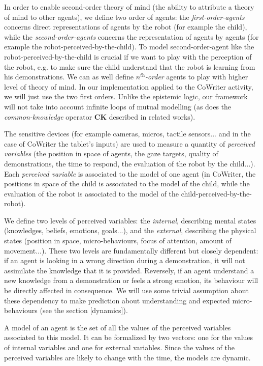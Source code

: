 \documentclass[10pt,a4paper,twocolumn]{article}
\begin{document}
In order to enable second-order theory of mind (the ability to attribute a theory of mind to other agents), we define two order of agents: the \textit{first-order-agents} concerns direct representations of agents by the robot (for example the child), while the \textit{second-order-agents} concerns the representation of agents by agents (for example the robot-perceived-by-the-child). To model second-order-agent like the robot-perceived-by-the-child is crucial if we want to play with the perception of the robot, e.g. to make sure the child understand that the robot is learning from his demonstrations. We can as well define \textit{$n^{\textit{th}}$-order} agents to play with higher level of theory of mind. In our implementation applied to the CoWriter activity, we will just use the two first orders. Unlike the epistemic logic, our framework will not take into account infinite loops of mutual modelling (as does the \textit{common-knowledge} operator \textbf{CK} described in related works). 

The sensitive devices (for example cameras, micros, tactile sensors... and in the case of CoWriter the tablet's inputs) are used to measure a quantity of \textit{perceived variables} (the position in space of agents, the gaze targets, quality of demonstrations, the time to respond, the evaluation of the robot by the child...). Each \textit{perceived variable} is associated to the model of one agent (in CoWriter, the positions in space of the child is associated to the model of the child, while the evaluation of the robot is associated to the model of the child-perceived-by-the-robot). 

We define two levels of perceived variables: the \textit{internal}, describing mental states (knowledges, beliefs, emotions, goals...), and the \textit{external}, describing the physical states (position in space, micro-behaviours, focus of attention, amount of movement...). These two levels are fundamentally different but closely dependent: if an agent is looking in a wrong direction during a demonstration, it will not assimilate the knowledge that it is provided. Reversely, if an agent understand a new knowledge from a demonstration or feels a strong emotion, its behaviour will be directly affected in consequence. We will use some trivial assumption about these dependency to make prediction about understanding and expected micro-behaviours (see the section [dynamics]).

A model of an agent is the set of all the values of the perceived variables associated to this model. It can be formalized by two vectors: one for the values of internal variables and one for external variables. Since the values of the perceived variables are likely to change with the time, the models are dynamic.
\end{document}
